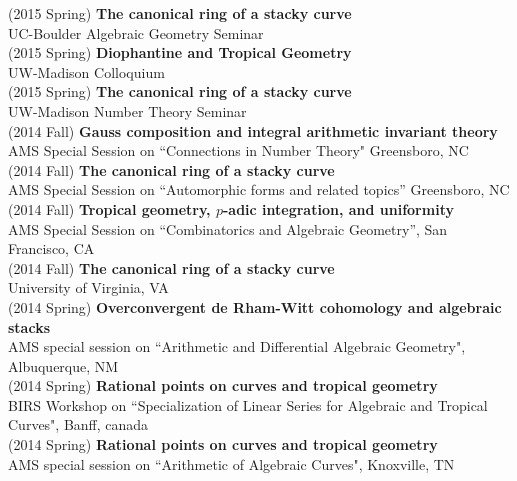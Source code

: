 \documentclass[margin,line]{res}
\begin{document}
\begin{resume}
(2015 Spring) \textbf{The canonical ring of a stacky curve}\\  
UC-Boulder Algebraic Geometry Seminar
\vspace{.05cm}\\
(2015 Spring) \textbf{Diophantine and Tropical Geometry}\\
UW-Madison Colloquium
\vspace{.05cm}\\
(2015 Spring) \textbf{The canonical ring of a stacky curve}\\  
UW-Madison Number Theory Seminar
\vspace{.05cm}\\
(2014 Fall) \textbf{Gauss composition and integral arithmetic invariant theory}\\  
AMS Special Session on  ``Connections in Number Theory" Greensboro, NC
\vspace{.05cm}\\
(2014 Fall) \textbf{The canonical ring of a stacky curve}\\
AMS Special Session on ``Automorphic forms and related topics'' Greensboro, NC
\vspace{.05cm}\\
(2014 Fall) \textbf{Tropical geometry, $p$-adic integration, and uniformity}\\
AMS Special Session on ``Combinatorics and Algebraic Geometry'', San Francisco, CA
\vspace{.05cm}\\
(2014 Fall) \textbf{The canonical ring of a stacky curve}\\  
University of Virginia, VA
\vspace{.05cm}\\
(2014 Spring) \textbf{Overconvergent de Rham-Witt cohomology and algebraic stacks}\\  
AMS special session on ``Arithmetic and Differential Algebraic Geometry", Albuquerque, NM
\vspace{.05cm}\\
(2014 Spring) \textbf{Rational points on curves and tropical geometry}\\  
BIRS Workshop on ``Specialization of Linear Series for Algebraic and Tropical Curves", Banff, canada
\vspace{.05cm}\\
(2014 Spring) \textbf{Rational points on curves and tropical geometry}\\  
AMS special session on ``Arithmetic of Algebraic Curves", Knoxville, TN
\vspace{.05cm}\\

\end{resume}
\end{document}
